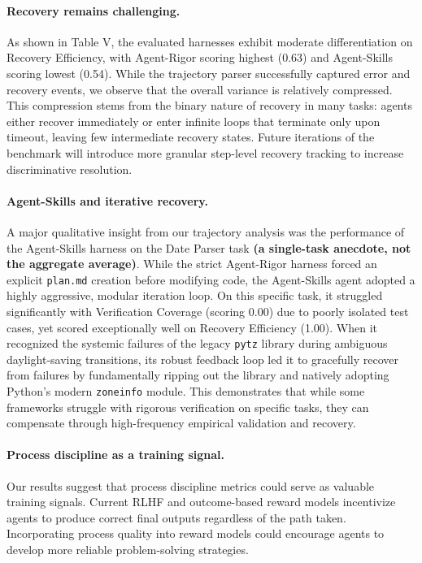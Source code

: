 \documentclass[letterpaper, 10 pt, conference]{ieeeconf}
\begin{document}
\paragraph{Recovery remains challenging.}
As shown in Table V, the evaluated harnesses exhibit moderate differentiation on Recovery Efficiency, with Agent-Rigor scoring highest (0.63) and Agent-Skills scoring lowest (0.54). While the trajectory parser successfully captured error and recovery events, we observe that the overall variance is relatively compressed. This compression stems from the binary nature of recovery in many tasks: agents either recover immediately or enter infinite loops that terminate only upon timeout, leaving few intermediate recovery states. Future iterations of the benchmark will introduce more granular step-level recovery tracking to increase discriminative resolution.

\paragraph{Agent-Skills and iterative recovery.}
A major qualitative insight from our trajectory analysis was the performance of the Agent-Skills harness on the Date Parser task \textbf{(a single-task anecdote, not the aggregate average)}. While the strict Agent-Rigor harness forced an explicit \texttt{plan.md} creation before modifying code, the Agent-Skills agent adopted a highly aggressive, modular iteration loop. On this specific task, it struggled significantly with Verification Coverage (scoring 0.00) due to poorly isolated test cases, yet scored exceptionally well on Recovery Efficiency (1.00). When it recognized the systemic failures of the legacy \texttt{pytz} library during ambiguous daylight-saving transitions, its robust feedback loop led it to gracefully recover from failures by fundamentally ripping out the library and natively adopting Python's modern \texttt{zoneinfo} module. This demonstrates that while some frameworks struggle with rigorous verification on specific tasks, they can compensate through high-frequency empirical validation and recovery.

\paragraph{Process discipline as a training signal.}
Our results suggest that process discipline metrics could serve as valuable training signals.
Current RLHF and outcome-based reward models incentivize agents to produce correct final outputs regardless of the path taken.
Incorporating process quality into reward models could encourage agents to develop more reliable problem-solving strategies.
\end{document}
